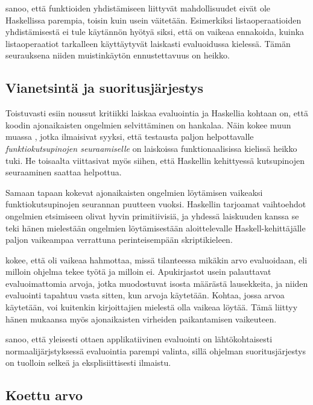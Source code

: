 \citet{vesakarvonen} sanoo, että funktioiden yhdistämiseen liittyvät mahdollisuudet eivät ole Haskellissa parempia, toisin kuin usein väitetään. Esimerkiksi listaoperaatioiden yhdistämisestä ei tule käytännön hyötyä siksi, että on vaikeaa ennakoida, kuinka listaoperaatiot tarkalleen käyttäytyvät laiskasti evaluoidussa kielessä. Tämän seurauksena niiden muistinkäytön ennustettavuus on heikko.

\subsection{Vianetsintä ja suoritusjärjestys}

Toistuvasti esiin noussut kritiikki laiskaa evaluointia ja Haskellia kohtaan on, että koodin ajonaikaisten ongelmien selvittäminen on hankalaa. Näin kokee muun muassa \citet{daniels2012experience}, jotka ilmaisivat syyksi, että testausta paljon helpottavalle \textit{funktiokutsupinojen seuraamiselle} on laiskoissa funktionaalisissa kielissä heikko tuki. He toisaalta viittasivat myös siihen, että Haskellin kehittyessä kutsupinojen seuraaminen saattaa helpottua.

Samaan tapaan \citet{pop2010experience} kokevat ajonaikaisten ongelmien löytämisen vaikeaksi funktiokutsupinojen seurannan puutteen vuoksi. Haskellin tarjoamat vaihtoehdot ongelmien etsimiseen olivat hyvin primitiivisiä, ja yhdessä laiskuuden kanssa se teki hänen mielestään ongelmien löytämisestään aloittelevalle Haskell-kehittäjälle paljon vaikeampaa verrattuna perinteisempään skriptikieleen.

\citet{sampson2009experience} kokee, että oli vaikeaa hahmottaa, missä tilanteessa mikäkin arvo evaluoidaan, eli milloin ohjelma tekee työtä ja milloin ei. Apukirjastot usein palauttavat evaluoimattomia arvoja, jotka muodostuvat isosta määrästä lausekkeita, ja niiden evaluointi tapahtuu vasta sitten, kun arvoja käytetään. Kohtaa, jossa arvoa käytetään, voi kuitenkin kirjoittajien mielestä olla vaikeaa löytää. Tämä liittyy hänen mukaansa myös ajonaikaisten virheiden paikantamisen vaikeuteen.

\citet{scott2009programming} sanoo, että yleisesti ottaen applikatiivinen evaluointi on lähtökohtaisesti normaalijärjstyksessä evaluointia parempi valinta, sillä ohjelman suoritusjärjestys on tuolloin selkeä ja eksplisiittisesti ilmaistu.

\subsection{Koettu arvo}

